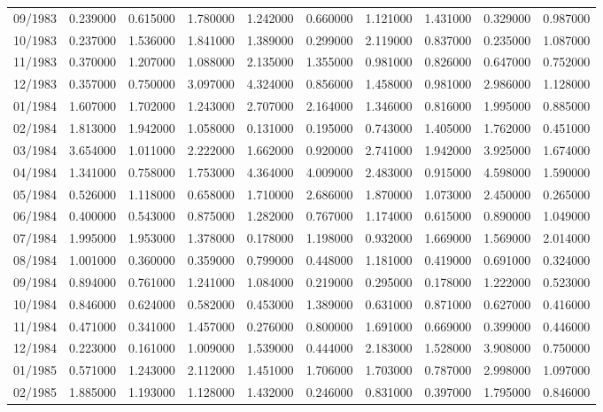 \begin{tabular}{lrrrrrrrrr}
09/1983 & 0.239000 & 0.615000 & 1.780000 & 1.242000 & 0.660000 & 1.121000 & 1.431000 & 0.329000 & 0.987000 \\
10/1983 & 0.237000 & 1.536000 & 1.841000 & 1.389000 & 0.299000 & 2.119000 & 0.837000 & 0.235000 & 1.087000 \\
11/1983 & 0.370000 & 1.207000 & 1.088000 & 2.135000 & 1.355000 & 0.981000 & 0.826000 & 0.647000 & 0.752000 \\
12/1983 & 0.357000 & 0.750000 & 3.097000 & 4.324000 & 0.856000 & 1.458000 & 0.981000 & 2.986000 & 1.128000 \\
01/1984 & 1.607000 & 1.702000 & 1.243000 & 2.707000 & 2.164000 & 1.346000 & 0.816000 & 1.995000 & 0.885000 \\
02/1984 & 1.813000 & 1.942000 & 1.058000 & 0.131000 & 0.195000 & 0.743000 & 1.405000 & 1.762000 & 0.451000 \\
03/1984 & 3.654000 & 1.011000 & 2.222000 & 1.662000 & 0.920000 & 2.741000 & 1.942000 & 3.925000 & 1.674000 \\
04/1984 & 1.341000 & 0.758000 & 1.753000 & 4.364000 & 4.009000 & 2.483000 & 0.915000 & 4.598000 & 1.590000 \\
05/1984 & 0.526000 & 1.118000 & 0.658000 & 1.710000 & 2.686000 & 1.870000 & 1.073000 & 2.450000 & 0.265000 \\
06/1984 & 0.400000 & 0.543000 & 0.875000 & 1.282000 & 0.767000 & 1.174000 & 0.615000 & 0.890000 & 1.049000 \\
07/1984 & 1.995000 & 1.953000 & 1.378000 & 0.178000 & 1.198000 & 0.932000 & 1.669000 & 1.569000 & 2.014000 \\
08/1984 & 1.001000 & 0.360000 & 0.359000 & 0.799000 & 0.448000 & 1.181000 & 0.419000 & 0.691000 & 0.324000 \\
09/1984 & 0.894000 & 0.761000 & 1.241000 & 1.084000 & 0.219000 & 0.295000 & 0.178000 & 1.222000 & 0.523000 \\
10/1984 & 0.846000 & 0.624000 & 0.582000 & 0.453000 & 1.389000 & 0.631000 & 0.871000 & 0.627000 & 0.416000 \\
11/1984 & 0.471000 & 0.341000 & 1.457000 & 0.276000 & 0.800000 & 1.691000 & 0.669000 & 0.399000 & 0.446000 \\
12/1984 & 0.223000 & 0.161000 & 1.009000 & 1.539000 & 0.444000 & 2.183000 & 1.528000 & 3.908000 & 0.750000 \\
01/1985 & 0.571000 & 1.243000 & 2.112000 & 1.451000 & 1.706000 & 1.703000 & 0.787000 & 2.998000 & 1.097000 \\
02/1985 & 1.885000 & 1.193000 & 1.128000 & 1.432000 & 0.246000 & 0.831000 & 0.397000 & 1.795000 & 0.846000 \\

\end{tabular}
